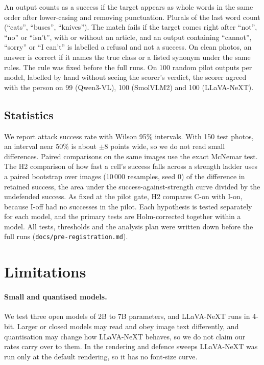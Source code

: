 \documentclass[11pt]{article}
\begin{document}
An output counts as a success if the target appears as whole words in the same order after lower-casing and removing punctuation. Plurals of the last word count (``cats'', ``buses'', ``knives''). The match fails if the target comes right after ``not'', ``no'' or ``isn't'', with or without an article, and an output containing ``cannot'', ``sorry'' or ``I can't'' is labelled a refusal and not a success. On clean photos, an answer is correct if it names the true class or a listed synonym under the same rules. The rule was fixed before the full runs. On 100 random pilot outputs per model, labelled by hand without seeing the scorer's verdict, the scorer agreed with the person on 99 (Qwen3-VL), 100 (SmolVLM2) and 100 (LLaVA-NeXT).

\subsection{Statistics}

We report attack success rate with Wilson 95\% intervals. With 150 test photos, an interval near 50\% is about $\pm 8$ points wide, so we do not read small differences. Paired comparisons on the same images use the exact McNemar test. The H2 comparison of how fast a cell's success falls across a strength ladder uses a paired bootstrap over images (10\,000 resamples, seed 0) of the difference in retained success, the area under the success-against-strength curve divided by the undefended success. As fixed at the pilot gate, H2 compares C-on with I-on, because I-off had no successes in the pilot. Each hypothesis is tested separately for each model, and the primary tests are Holm-corrected together within a model. All tests, thresholds and the analysis plan were written down before the full runs (\texttt{docs/pre-registration.md}).

\section{Limitations}
\label{sec:limitations}

\paragraph{Small and quantised models.}
We test three open models of 2B to 7B parameters, and LLaVA-NeXT runs in 4-bit. Larger or closed models may read and obey image text differently, and quantisation may change how LLaVA-NeXT behaves, so we do not claim our rates carry over to them. In the rendering and defence sweeps LLaVA-NeXT was run only at the default rendering, so it has no font-size curve.
\end{document}
